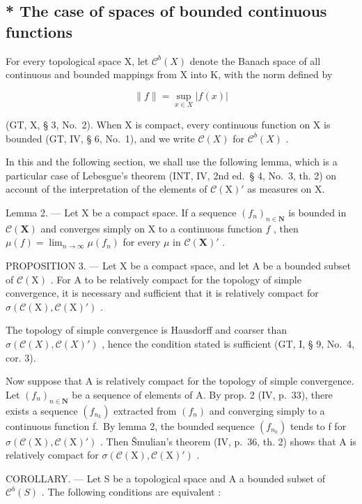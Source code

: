 \subsection{* The case of spaces of bounded continuous functions}

For every topological space X, let \(\mathcal{C}^{b}(X)\) denote the Banach space of all continuous and bounded mappings from X into K, with the norm defined by

\[
\| f \| = \sup _ {x \in X} | f (x) |\tag{6}
\]

(GT, X, § 3, No.~2). When X is compact, every continuous function on X is bounded (GT, IV, § 6, No.~1), and we write \(\mathcal{C}(X)\) for \(\mathcal{C}^b(X)\) .

In this and the following section, we shall use the following lemma, which is a particular case of Lebesgue's theorem (INT, IV, 2nd ed.~§ 4, No.~3, th. 2) on account of the interpretation of the elements of \(\mathcal{C}(\mathrm{X})'\) as measures on X.

Lemma 2. --- Let X be a compact space. If a sequence \((f_n)_{n\in \mathbf{N}}\) is bounded in \(\mathcal{C}(\mathbf{X})\) and converges simply on X to a continuous function \(f\) , then \(\mu(f) = \lim_{n\to \infty}\mu(f_n)\) for every \(\mu\) in \(\mathcal{C}(\mathbf{X})'\) .

PROPOSITION 3. --- Let X be a compact space, and let A be a bounded subset of \(\mathcal{C}(\mathrm{X})\) . For A to be relatively compact for the topology of simple convergence, it is necessary and sufficient that it is relatively compact for \(\sigma(\mathcal{C}(\mathrm{X}), \mathcal{C}(\mathrm{X})')\) .

The topology of simple convergence is Hausdorff and coarser than \(\sigma(\mathcal{C}(X), \mathcal{C}(X)')\) , hence the condition stated is sufficient (GT, I, § 9, No.~4, cor. 3).

Now suppose that A is relatively compact for the topology of simple convergence. Let \((f_{n})_{n\in\mathbf{N}}\) be a sequence of elements of A. By prop. 2 (IV, p.~33), there exists a sequence \((f_{n_{k}})\) extracted from \((f_{n})\) and converging simply to a continuous function f.~By lemma 2, the bounded sequence \((f_{n_{k}})\) tends to f for \(\sigma(\mathcal{C}(\mathrm{X}),\mathcal{C}(\mathrm{X})')\) . Then Šmulian's theorem (IV, p.~36, th. 2) shows that A is relatively compact for \(\sigma(\mathcal{C}(\mathrm{X}),\mathcal{C}(\mathrm{X})')\) .

COROLLARY. --- Let S be a topological space and A a bounded subset of \(\mathcal{C}^{b}(S)\) . The following conditions are equivalent :

